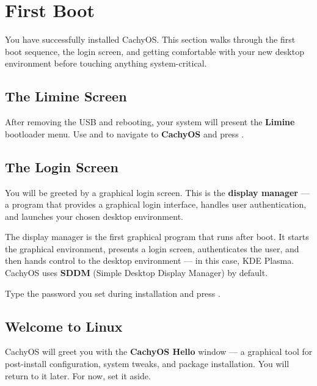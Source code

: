 \documentclass{article}
\begin{document}
\newpage
\section{First Boot}

You have successfully installed CachyOS. This section walks through the first boot
sequence, the login screen, and getting comfortable with your new desktop environment
before touching anything system-critical.

\subsection{The Limine Screen}

After removing the USB and rebooting, your system will present the \textbf{Limine}
bootloader menu. Use \keys{\arrowkeyup} and \keys{\arrowkeydown} to navigate to
\textbf{CachyOS} and press \keys{\return}.

\subsection{The Login Screen}

You will be greeted by a graphical login screen. This is the \textbf{display manager}
--- a program that provides a graphical login interface, handles user authentication,
and launches your chosen desktop environment.

\begin{tcolorbox}[arc=12pt, outer arc=10pt,
	colback=blue!4!white, colframe=blue!40!black,
	title=\textbf{What is a Display Manager?}]
	The display manager is the first graphical program that runs after boot. It starts
	the graphical environment, presents a login screen, authenticates the user, and
	then hands control to the desktop environment --- in this case, KDE Plasma. CachyOS
	uses \textbf{SDDM} (Simple Desktop Display Manager) by default.
\end{tcolorbox}

\noindent Type the password you set during installation and press \keys{\return}.

\subsection{Welcome to Linux}

CachyOS will greet you with the \textbf{CachyOS Hello} window --- a graphical tool
for post-install configuration, system tweaks, and package installation. You will
return to it later. For now, set it aside.
\end{document}
